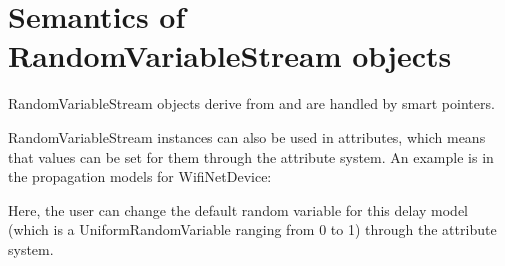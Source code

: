 \documentclass[letterpaper,10pt,english]{sphinxmanual}
\renewcommand{\sphinxcode}[1]{\texttt{\small{#1}}}
\begin{document}
\section{Semantics of RandomVariableStream objects}
\label{\detokenize{random-variables:semantics-of-randomvariablestream-objects}}
RandomVariableStream objects derive from \sphinxcode{} and are
handled by smart pointers.

RandomVariableStream instances can also be used in  attributes, which means
that values can be set for them through the  attribute system.
An example is in the propagation models for WifiNetDevice:

\begin{sphinxVerbatim}[commandchars=\\\{\}]
 
       
     
     
     
     
                    
                    
                    
   
\end{sphinxVerbatim}

Here, the  user can change the default random variable for this
delay model (which is a UniformRandomVariable ranging from 0 to 1) through
the attribute system.
\end{document}
